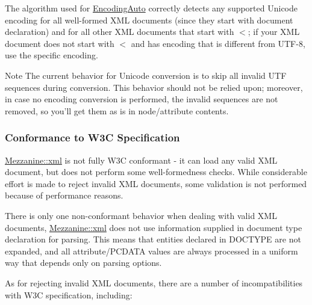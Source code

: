 The algorithm used for \hyperlink{namespaceMezzanine_1_1xml_ab1e7e96991b9c08ac13e797a15253804}{EncodingAuto} correctly detects any supported Unicode encoding for all well-\/formed XML documents (since they start with document declaration) and for all other XML documents that start with $<$; if your XML document does not start with $<$ and has encoding that is different from UTF-\/8, use the specific encoding. \begin{DoxyNote}{Note}
The current behavior for Unicode conversion is to skip all invalid UTF sequences during conversion. This behavior should not be relied upon; moreover, in case no encoding conversion is performed, the invalid sequences are not removed, so you'll get them as is in node/attribute contents.
\end{DoxyNote}
\hypertarget{XMLManual_XMLLoadingStandards}{}\subsubsection{Conformance to W3C Specification}\label{XMLManual_XMLLoadingStandards}
\hyperlink{namespaceMezzanine_1_1xml}{Mezzanine::xml} is not fully W3C conformant -\/ it can load any valid XML document, but does not perform some well-\/formedness checks. While considerable effort is made to reject invalid XML documents, some validation is not performed because of performance reasons. \par
 \par
 There is only one non-\/conformant behavior when dealing with valid XML documents, \hyperlink{namespaceMezzanine_1_1xml}{Mezzanine::xml} does not use information supplied in document type declaration for parsing. This means that entities declared in DOCTYPE are not expanded, and all attribute/PCDATA values are always processed in a uniform way that depends only on parsing options. \par
 \par
 As for rejecting invalid XML documents, there are a number of incompatibilities with W3C specification, including:
